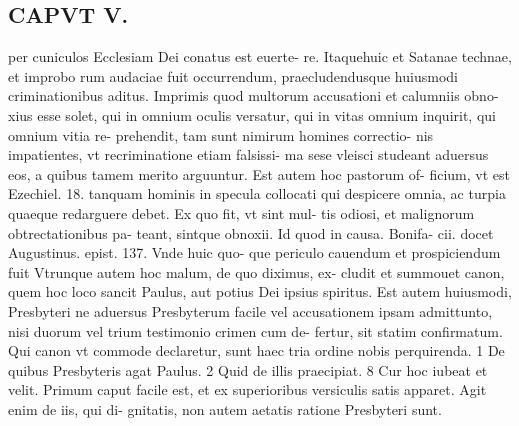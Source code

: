 \documentclass{article}
\begin{document}
\begin{pages}
\section*{CAPVT  V. }
\marginpar{[ p.33 ]}\pstart per cuniculos Ecclesiam Dei conatus est euerte- re. Itaquehuic et Satanae technae, et improbo rum audaciae fuit occurrendum, praecludendusque huiusmodi criminationibus aditus. Imprimis quod multorum accusationi et calumniis obno- xius esse solet, qui in omnium oculis versatur, qui in vitas omnium inquirit, qui omnium vitia re- prehendit, tam sunt nimirum homines correctio- nis impatientes, vt recriminatione etiam falsissi- ma sese vleisci studeant aduersus eos, a quibus tamem merito arguuntur. Est autem hoc pastorum of- ficium, vt est Ezechiel. 18. tanquam hominis in specula collocati qui despicere omnia, ac turpia quaeque redarguere debet. Ex quo fit, vt sint mul- tis odiosi, et malignorum obtrectationibus pa- teant, sintque obnoxii. Id quod in causa. Bonifa- cii. docet Augustinus. epist. 137. Vnde huic quo- que periculo cauendum et prospiciendum fuit Vtrunque autem hoc malum, de quo diximus, ex- cludit et summouet canon, quem hoc loco sancit Paulus, aut potius Dei ipsius spiritus. Est autem huiusmodi, Presbyteri ne aduersus Presbyterum facile vel accusationem ipsam admittunto, nisi duorum vel trium testimonio crimen cum de- fertur, sit statim confirmatum. Qui canon vt commode declaretur, sunt haec tria ordine nobis perquirenda. 1 De quibus Presbyteris agat Paulus. 2 Quid de illis praecipiat. 8 Cur hoc iubeat et velit. Primum caput facile est, et ex superioribus versiculis satis apparet. Agit enim de iis, qui di- gnitatis, non autem aetatis ratione Presbyteri sunt.  \pend

\end{pages}
\end{document}
